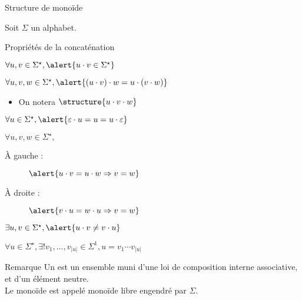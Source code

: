 
\begingroup

\begin{frame}{Structure de monoïde}

  Soit $\Sigma$ un alphabet. 
  
  \begin{block}{Propriétés de la concaténation}
    \begin{description}
    \item[Fermeture :] $\forall u, v \in \Sigma^\star, \alert{u\cdot v \in \Sigma^\star}$
    \item[Associativité :] $\forall u, v, w \in \Sigma^\star, \alert{(u\cdot v)\cdot w = u\cdot (v\cdot w)}$
      \begin{itemize}
      \item On notera $\structure{u\cdot v\cdot w}$
      \end{itemize}
    \item[Neutralité d'$\varepsilon$ :] $\forall u \in \Sigma^\star, \alert{\varepsilon \cdot u = u = u \cdot \varepsilon}$
    \item[Simplifiabilité :] $\forall u, v, w \in \Sigma^\star,$
      \begin{description}
      \item[À gauche :] $\alert{u \cdot v = u \cdot w \Rightarrow v=w}$
      \item[À droite :] $\alert{v \cdot u = w \cdot u \Rightarrow v=w}$
      \end{description}
    \item[Non-commutativité :] $\exists u,v \in \Sigma^\star, \alert{u\cdot v \neq v\cdot u}$
    \item[Décomposabilité :] $\forall u\in \Sigma^\star, \exists! v_1,..., v_{|u|} \in \Sigma^1, u = v_1 \cdots v_{|u|}$ 
    \end{description}
  \end{block}

  \begin{block}{Remarque}
    Un  est un ensemble muni d'une loi de composition interne associative, et d'un élément neutre. \\
    Le monoïde \structure{$\langle \Sigma^\star, \cdot , \varepsilon \rangle$} est appelé \alert{monoïde libre engendré par $\Sigma$}.
  \end{block}

\end{frame}

\endgroup
